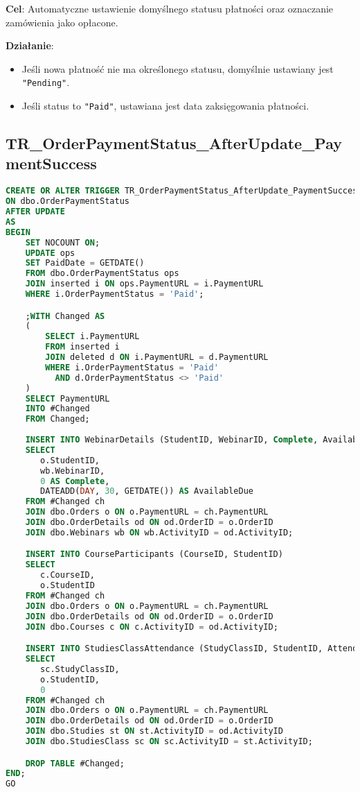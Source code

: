 \documentclass[12pt]{article}
\begin{document}
\noindent \textbf{Cel}: Automatyczne ustawienie domyślnego statusu płatności oraz oznaczanie zamówienia jako opłacone.  


\noindent \textbf{Działanie}:  
\begin{itemize}
    \item Jeśli nowa płatność nie ma określonego statusu, domyślnie ustawiany jest \texttt{"Pending"}.
    \item Jeśli status to \texttt{"Paid"}, ustawiana jest data zaksięgowania płatności.
\end{itemize}


\newpage
\subsection{TR\_OrderPaymentStatus\_AfterUpdate\_PaymentSuccess}

\begin{lstlisting}[language=SQL]
CREATE OR ALTER TRIGGER TR_OrderPaymentStatus_AfterUpdate_PaymentSuccess
ON dbo.OrderPaymentStatus
AFTER UPDATE
AS
BEGIN
    SET NOCOUNT ON;
    UPDATE ops
    SET PaidDate = GETDATE()
    FROM dbo.OrderPaymentStatus ops
    JOIN inserted i ON ops.PaymentURL = i.PaymentURL
    WHERE i.OrderPaymentStatus = 'Paid';

    ;WITH Changed AS
    (
        SELECT i.PaymentURL
        FROM inserted i
        JOIN deleted d ON i.PaymentURL = d.PaymentURL
        WHERE i.OrderPaymentStatus = 'Paid'
          AND d.OrderPaymentStatus <> 'Paid'
    )
    SELECT PaymentURL
    INTO #Changed
    FROM Changed;
    
    INSERT INTO WebinarDetails (StudentID, WebinarID, Complete, AvailableDue)
    SELECT
       o.StudentID,
       wb.WebinarID,
       0 AS Complete,
       DATEADD(DAY, 30, GETDATE()) AS AvailableDue
    FROM #Changed ch
    JOIN dbo.Orders o ON o.PaymentURL = ch.PaymentURL
    JOIN dbo.OrderDetails od ON od.OrderID = o.OrderID
    JOIN dbo.Webinars wb ON wb.ActivityID = od.ActivityID;

    INSERT INTO CourseParticipants (CourseID, StudentID)
    SELECT
       c.CourseID,
       o.StudentID
    FROM #Changed ch
    JOIN dbo.Orders o ON o.PaymentURL = ch.PaymentURL
    JOIN dbo.OrderDetails od ON od.OrderID = o.OrderID
    JOIN dbo.Courses c ON c.ActivityID = od.ActivityID;

    INSERT INTO StudiesClassAttendance (StudyClassID, StudentID, Attendance)
    SELECT
       sc.StudyClassID,
       o.StudentID,
       0 
    FROM #Changed ch
    JOIN dbo.Orders o ON o.PaymentURL = ch.PaymentURL
    JOIN dbo.OrderDetails od ON od.OrderID = o.OrderID
    JOIN dbo.Studies st ON st.ActivityID = od.ActivityID
    JOIN dbo.StudiesClass sc ON sc.ActivityID = st.ActivityID;

    DROP TABLE #Changed;
END;
GO
\end{lstlisting}
\end{document}
